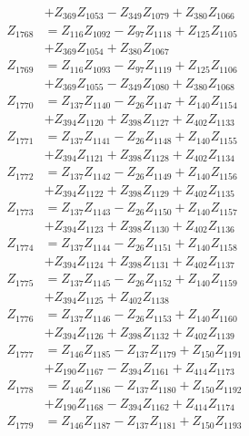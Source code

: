 \begin{multicols}{2}
\begin{align}
&+ Z_{369}Z_{1053} - Z_{349}Z_{1079} + Z_{380}Z_{1066} \nonumber \\
Z_{1768} &= Z_{116}Z_{1092} - Z_{97}Z_{1118} + Z_{125}Z_{1105}  \nonumber \\
&+ Z_{369}Z_{1054} + Z_{380}Z_{1067} \nonumber \\
Z_{1769} &= Z_{116}Z_{1093} - Z_{97}Z_{1119} + Z_{125}Z_{1106}  \nonumber \\
&+ Z_{369}Z_{1055} - Z_{349}Z_{1080} + Z_{380}Z_{1068} \nonumber \\
Z_{1770} &= Z_{137}Z_{1140} - Z_{26}Z_{1147} + Z_{140}Z_{1154}  \nonumber \\
&+ Z_{394}Z_{1120} + Z_{398}Z_{1127} + Z_{402}Z_{1133} \nonumber \\
Z_{1771} &= Z_{137}Z_{1141} - Z_{26}Z_{1148} + Z_{140}Z_{1155}  \nonumber \\
&+ Z_{394}Z_{1121} + Z_{398}Z_{1128} + Z_{402}Z_{1134} \nonumber \\
Z_{1772} &= Z_{137}Z_{1142} - Z_{26}Z_{1149} + Z_{140}Z_{1156}  \nonumber \\
&+ Z_{394}Z_{1122} + Z_{398}Z_{1129} + Z_{402}Z_{1135} \nonumber \\
Z_{1773} &= Z_{137}Z_{1143} - Z_{26}Z_{1150} + Z_{140}Z_{1157}  \nonumber \\
&+ Z_{394}Z_{1123} + Z_{398}Z_{1130} + Z_{402}Z_{1136} \nonumber \\
Z_{1774} &= Z_{137}Z_{1144} - Z_{26}Z_{1151} + Z_{140}Z_{1158}  \nonumber \\
&+ Z_{394}Z_{1124} + Z_{398}Z_{1131} + Z_{402}Z_{1137} \nonumber \\
Z_{1775} &= Z_{137}Z_{1145} - Z_{26}Z_{1152} + Z_{140}Z_{1159}  \nonumber \\
&+ Z_{394}Z_{1125} + Z_{402}Z_{1138} \nonumber \\
Z_{1776} &= Z_{137}Z_{1146} - Z_{26}Z_{1153} + Z_{140}Z_{1160}  \nonumber \\
&+ Z_{394}Z_{1126} + Z_{398}Z_{1132} + Z_{402}Z_{1139} \nonumber \\
Z_{1777} &= Z_{146}Z_{1185} - Z_{137}Z_{1179} + Z_{150}Z_{1191}  \nonumber \\
&+ Z_{190}Z_{1167} - Z_{394}Z_{1161} + Z_{414}Z_{1173} \nonumber \\
Z_{1778} &= Z_{146}Z_{1186} - Z_{137}Z_{1180} + Z_{150}Z_{1192}  \nonumber \\
&+ Z_{190}Z_{1168} - Z_{394}Z_{1162} + Z_{414}Z_{1174} \nonumber \\
Z_{1779} &= Z_{146}Z_{1187} - Z_{137}Z_{1181} + Z_{150}Z_{1193}  \nonumber \\

\end{align}
\end{multicols}
